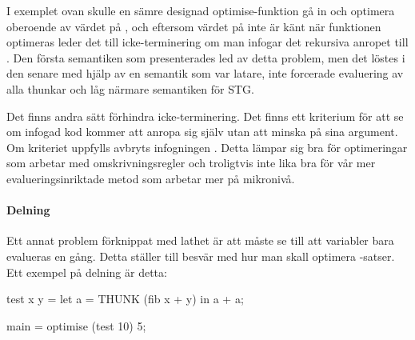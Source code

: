 \documentclass[Rapport]{subfiles}
\begin{document}
I exemplet ovan skulle en sämre designad optimise-funktion gå in och optimera  oberoende av värdet på
, och eftersom värdet på  inte är känt när funktionen optimeras leder det till
icke-terminering om man infogar det rekursiva anropet till .
    Den första semantiken som presenterades led av detta problem, men det löstes i den senare med hjälp av
en semantik som var latare, inte forcerade evaluering av alla thunkar och låg närmare semantiken för STG.

Det finns andra sätt förhindra icke-terminering.
Det finns ett kriterium för att se om infogad kod kommer att anropa sig själv 
utan att minska på sina argument. Om kriteriet uppfylls avbryts infogningen 
\cite{mitchell2007supercompiler}. Detta lämpar sig bra för optimeringar som 
arbetar med omskrivningsregler och troligtvis inte lika bra för vår mer 
evalueringsinriktade metod som arbetar mer på mikronivå.

\begin{comment}
\subsection{Optimise-with}
En annan möjlig lösning på problemet ovan är att låta programmeraren själv avgöra hur
många gånger en funktion får infogas, som här:

\begin{codeEx}
main = optimise (take 5) with { inline take 5 } [1,2,3,4,5,6,7];
\end{codeEx}

I exemplet ovan betyder \ic{inline take 5} att \ic{take} bara får infogas $5$ gånger.
En funktionalitet som skulle kunna gynna optimise, eller användandet av den,
är att den skulle kunna detektera när den potentiellt skulle falla in i en
oändlig infogningsloop. Det har inte gjorts till det här arbetet.
\end{comment}

\paragraph{Delning}
Ett annat problem förknippat med lathet är att  måste se till att variabler bara 
evalueras en gång. Detta ställer till besvär med hur man skall optimera -satser.
Ett exempel på delning är detta:

\begin{codeEx}
test x y = let
    { a = THUNK (fib x + y)
    } in a + a;

main = optimise (test 10) 5;
\end{codeEx}
\end{document}
